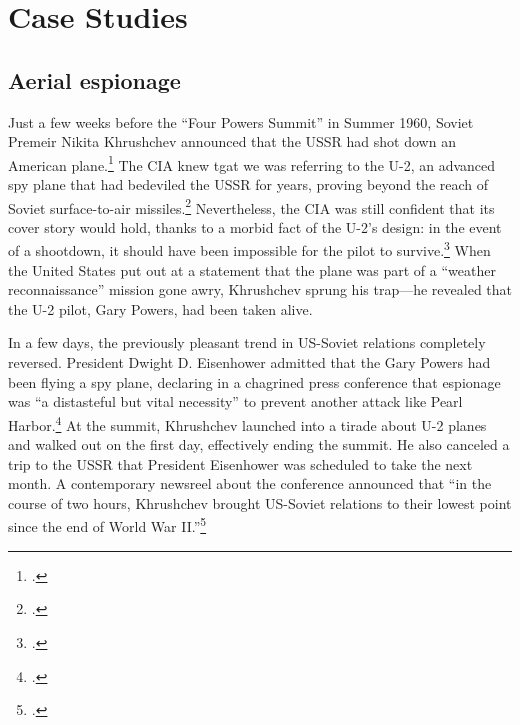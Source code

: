 \documentclass[12pt]{extarticle}
\begin{document}

\section{Case Studies}

\subsection{Aerial espionage}
Just a few weeks before the \enquote{Four Powers Summit} in Summer 1960, Soviet Premeir Nikita Khrushchev announced that the USSR had shot down an American plane.\footcite[112]{powers_operation_2004} The CIA knew tgat we was referring to the U-2, an advanced spy plane that had bedeviled the USSR for years, proving beyond the reach of Soviet surface-to-air missiles.\footcite{orlov_u-2_2007} Nevertheless, the CIA was still confident that its cover story would hold, thanks to a morbid fact of the U-2's design: in the event of a shootdown, it should have been impossible for the pilot to survive.\footcite[35]{lindgren_trust_2000} When the United States put out at a statement that the plane was part of a \enquote{weather reconnaissance} mission gone awry, Khrushchev sprung his trap---he revealed that the U-2 pilot, Gary Powers, had been taken alive.

In a few days, the previously pleasant trend in US-Soviet relations completely reversed. President Dwight D. Eisenhower admitted that the Gary Powers had been flying a spy plane, declaring in a chagrined press conference that espionage was ``a distasteful but vital necessity'' to prevent another attack like Pearl Harbor.\footcite{eisenhower_news_1960} At the summit, Khrushchev launched into a tirade about U-2 planes and walked out on the first day, effectively ending the summit. He also canceled a trip to the USSR that President Eisenhower was scheduled to take the next month. A contemporary newsreel about the conference announced that \enquote{in the course of two hours, Khrushchev brought US-Soviet relations to their lowest point since the end of World War II.}\footcite{universal_studios_summit_1960}
\end{document}
